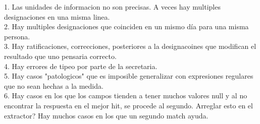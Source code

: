 1. Las unidades de informacion no son precisas. A veces hay multiples designaciones en una misma linea. \\
2. Hay multiples designaciones que coinciden en un mismo día para una misma persona. \\
3. Hay ratificaciones, correcciones, posteriores a la designacoines que modifican el resultado que uno pensaria correcto.\\
4. Hay errores de tipeo por parte de la secretaria.\\
5. Hay casos "patologicos" que es imposible generalizar con expresiones regulares que no sean hechas a la medida. \\
6. Hay casos en los que los campos tienden a tener muchos valores null y al no encontrar la respuesta en el mejor hit, se procede al segundo. Arreglar esto en el extractor? Hay muchos casos en los que un segundo match ayuda. \\
